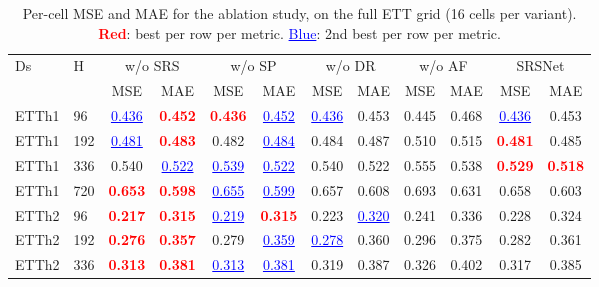 \begin{table}[h]
  \caption{Per-cell MSE and MAE for the ablation study, on the
    full ETT grid (16 cells per variant).
    \textcolor{red}{\textbf{Red}}: best per row per metric.
    \textcolor{blue}{\underline{Blue}}: 2nd best per row per
    metric.}
  \label{tab:tab4-mae}
  \begin{center}
  \scriptsize
  \setlength{\tabcolsep}{2pt}
  \begin{tabular}{ll|cc|cc|cc|cc|cc}
    \toprule
    Ds & H & \multicolumn{2}{c|}{w/o SRS} & \multicolumn{2}{c|}{w/o SP} & \multicolumn{2}{c|}{w/o DR} & \multicolumn{2}{c|}{w/o AF} & \multicolumn{2}{c}{SRSNet} \\
       &   & MSE & MAE & MSE & MAE & MSE & MAE & MSE & MAE & MSE & MAE \\
    \midrule
    ETTh1 & 96  & \textcolor{blue}{\underline{0.436}} & \textcolor{red}{\textbf{0.452}} & \textcolor{red}{\textbf{0.436}} & \textcolor{blue}{\underline{0.452}} & \textcolor{blue}{\underline{0.436}} & 0.453 & 0.445 & 0.468 & \textcolor{blue}{\underline{0.436}} & 0.453 \\
    ETTh1 & 192 & \textcolor{blue}{\underline{0.481}} & \textcolor{red}{\textbf{0.483}} & 0.482 & \textcolor{blue}{\underline{0.484}} & 0.484 & 0.487 & 0.510 & 0.515 & \textcolor{red}{\textbf{0.481}} & 0.485 \\
    ETTh1 & 336 & 0.540 & \textcolor{blue}{\underline{0.522}} & \textcolor{blue}{\underline{0.539}} & \textcolor{blue}{\underline{0.522}} & 0.540 & 0.522 & 0.555 & 0.538 & \textcolor{red}{\textbf{0.529}} & \textcolor{red}{\textbf{0.518}} \\
    ETTh1 & 720 & \textcolor{red}{\textbf{0.653}} & \textcolor{red}{\textbf{0.598}} & \textcolor{blue}{\underline{0.655}} & \textcolor{blue}{\underline{0.599}} & 0.657 & 0.608 & 0.693 & 0.631 & 0.658 & 0.603 \\
    \midrule
    ETTh2 & 96  & \textcolor{red}{\textbf{0.217}} & \textcolor{red}{\textbf{0.315}} & \textcolor{blue}{\underline{0.219}} & \textcolor{red}{\textbf{0.315}} & 0.223 & \textcolor{blue}{\underline{0.320}} & 0.241 & 0.336 & 0.228 & 0.324 \\
    ETTh2 & 192 & \textcolor{red}{\textbf{0.276}} & \textcolor{red}{\textbf{0.357}} & 0.279 & \textcolor{blue}{\underline{0.359}} & \textcolor{blue}{\underline{0.278}} & 0.360 & 0.296 & 0.375 & 0.282 & 0.361 \\
    ETTh2 & 336 & \textcolor{red}{\textbf{0.313}} & \textcolor{red}{\textbf{0.381}} & \textcolor{blue}{\underline{0.313}} & \textcolor{blue}{\underline{0.381}} & 0.319 & 0.387 & 0.326 & 0.402 & 0.317 & 0.385 \\

\end{tabular}
\end{center}
\end{table}
